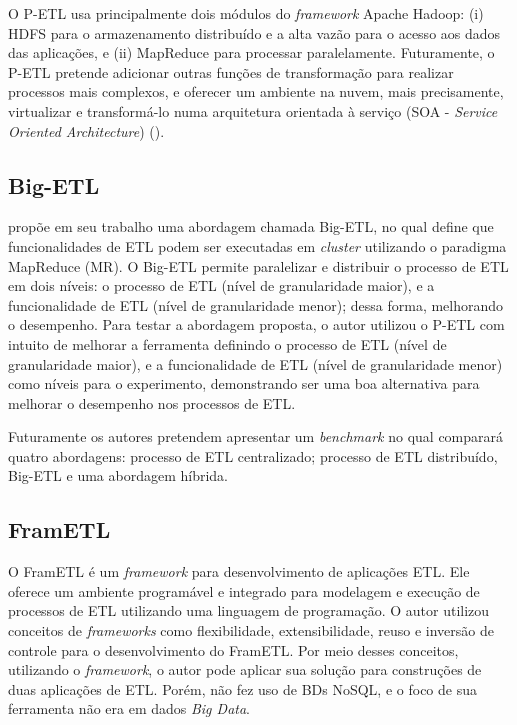 O P-ETL usa principalmente dois módulos do \textit{framework} Apache Hadoop: (i) HDFS para o armazenamento distribuído e a alta vazão para o acesso aos dados das aplicações, e (ii) MapReduce para processar paralelamente. Futuramente, o P-ETL pretende adicionar outras funções de transformação para realizar processos mais complexos, e oferecer um ambiente na nuvem, mais precisamente, virtualizar e transformá-lo numa arquitetura orientada à serviço (SOA - \textit{Service Oriented Architecture}) (\cite{bala:2014}).


\subsection{Big-ETL}

\cite{bala:2015} propõe em seu trabalho uma abordagem chamada Big-ETL, no qual define que funcionalidades de ETL podem ser executadas em \textit{cluster} utilizando o paradigma MapReduce (MR). O Big-ETL permite paralelizar e distribuir o processo de ETL em dois níveis: o processo de ETL (nível de granularidade maior), e a funcionalidade de ETL (nível de granularidade menor); dessa forma, melhorando o desempenho. Para testar a abordagem proposta, o autor utilizou o P-ETL com intuito de melhorar a ferramenta definindo o processo de ETL (nível de granularidade maior), e a funcionalidade de ETL (nível de granularidade menor) como níveis para o experimento, demonstrando ser uma boa alternativa para melhorar o desempenho nos processos de ETL.

Futuramente os autores pretendem apresentar um \textit{benchmark} no qual comparará quatro abordagens: processo de ETL centralizado; processo de ETL distribuído, Big-ETL e uma abordagem híbrida.

\subsection{FramETL}

O FramETL é um \textit{framework} para desenvolvimento de aplicações ETL. Ele oferece um ambiente programável e integrado para modelagem e execução de processos de ETL utilizando uma linguagem de programação. O autor utilizou conceitos de \textit{frameworks} como flexibilidade, extensibilidade, reuso e inversão de controle para o desenvolvimento do FramETL. Por meio desses conceitos, utilizando o \textit{framework}, o autor pode aplicar sua solução para construções de duas aplicações de ETL. Porém, \cite{silva:2012} não fez uso de BDs NoSQL, e o foco de sua ferramenta não era em dados \textit{Big Data}.

